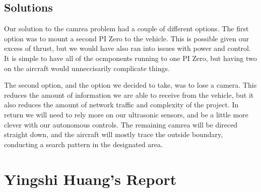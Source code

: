 \documentclass[onecolumn, draftclsnofoot,10pt, compsoc]{IEEEtran}
\begin{document}
\subsection{Solutions}

Our solution to the camrea problem had a couple of different options. The first option was to mount a second PI Zero to the vehicle. This is possible given our excess of thrust, but we would have also ran into issues with power and control. It is simple to have all of the ocmponents running to one PI Zero, but having two on the aircraft would unneccisarily complicate things.

The second option, and the option we decided to take, was to lose a camera. This reduces the amount of information we are able to receive from the vehicle, but it also reduces the amount of network traffic and complexity of the project. In return we will need to rely more on our ultrasonic sensors, and be a little more clever with our autonomous controls. The remaining camrea will be direced straight down, and the aircraft will mostly trace the outside boundary, conducting a search pattern in the designated area.

\section{Yingshi Huang's Report}
\end{document}

